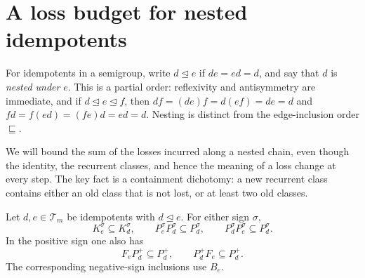 \section{A loss budget for nested idempotents}
\label{nest:section}

For idempotents in a semigroup, write $d\trianglelefteq e$ if
$de=ed=d$, and say that $d$ is \emph{nested under} $e$.
This is a partial order: reflexivity and antisymmetry are immediate,
and if $d\trianglelefteq e\trianglelefteq f$, then
$df=(de)f=d(ef)=de=d$ and $fd=f(ed)=(fe)d=ed=d$.
Nesting is distinct from the edge-inclusion order $\sqsubseteq$.

We will bound the sum of the losses incurred along a nested chain,
even though the identity, the recurrent classes, and hence the meaning
of a loss change at every step. The key fact is a containment dichotomy:
a new recurrent class contains either an old class that is not lost,
or at least two old classes.

\begin{lemma}
\label{nest:absorption}
Let $d,e\in\mathcal T_m$ be idempotents with $d\trianglelefteq e$.
For either sign $\sigma$,
\[
 K_e^\sigma\subseteq K_d^\sigma,
 \qquad
 P_e^\sigma P_d^\sigma\subseteq P_d^\sigma,
 \qquad
 P_d^\sigma P_e^\sigma\subseteq P_d^\sigma.
\]
In the positive sign one also has
\begin{equation}
\label{nest:through-absorption}
 F_eP_d^+\subseteq P_d^+,
 \qquad P_d^+F_e\subseteq P_d^+.
\end{equation}
The corresponding negative-sign inclusions use $B_e$.
\end{lemma}

